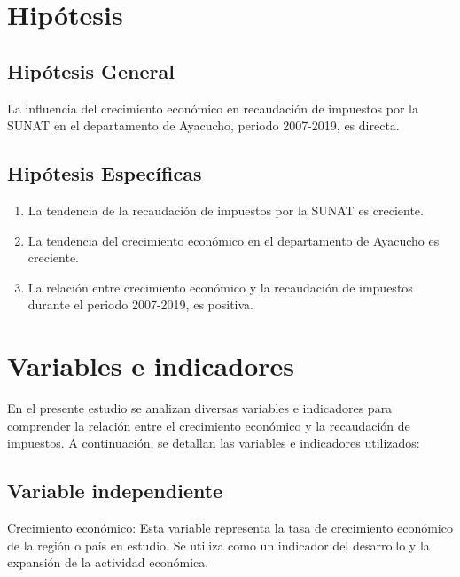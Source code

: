 \documentclass[
  letterpaper,
  DIV=11,
  numbers=noendperiod]{scrartcl}
\begin{document}
\hypertarget{sec-hipuxf3tesis}{%
\section{Hipótesis}\label{sec-hipuxf3tesis}}

\hypertarget{sec-hipuxf3tesis-general}{%
\subsection{Hipótesis General}\label{sec-hipuxf3tesis-general}}

La influencia del crecimiento económico en recaudación de impuestos por
la SUNAT en el departamento de Ayacucho, periodo 2007-2019, es directa.

\hypertarget{sec-hipuxf3tesis-especuxedficas}{%
\subsection{Hipótesis
Específicas}\label{sec-hipuxf3tesis-especuxedficas}}

\begin{enumerate}
\def\labelenumi{\arabic{enumi}.}
\item
  La tendencia de la recaudación de impuestos por la SUNAT es creciente.
\item
  La tendencia del crecimiento económico en el departamento de Ayacucho
  es creciente.
\item
  La relación entre crecimiento económico y la recaudación de impuestos
  durante el periodo 2007-2019, es positiva.
\end{enumerate}

\hypertarget{sec-variables-e-indicadores}{%
\section{Variables e indicadores}\label{sec-variables-e-indicadores}}

En el presente estudio se analizan diversas variables e indicadores para
comprender la relación entre el crecimiento económico y la recaudación
de impuestos. A continuación, se detallan las variables e indicadores
utilizados:

\hypertarget{sec-variable-independiente}{%
\subsection{Variable independiente}\label{sec-variable-independiente}}

Crecimiento económico: Esta variable representa la tasa de crecimiento
económico de la región o país en estudio. Se utiliza como un indicador
del desarrollo y la expansión de la actividad económica.
\end{document}
